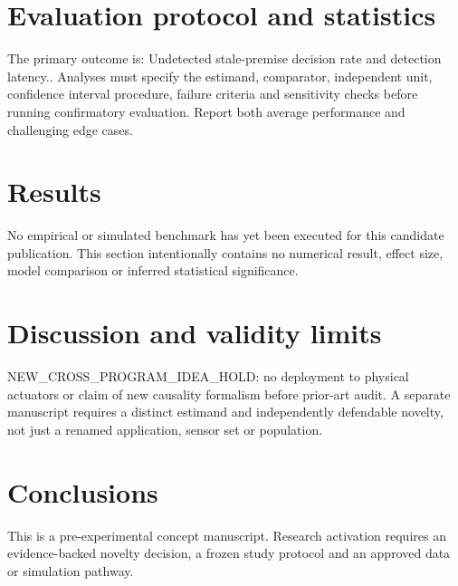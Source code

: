 \documentclass[11pt,a4paper]{article}
\begin{document}
\section{Evaluation protocol and statistics}
The primary outcome is: Undetected stale-premise decision rate and detection latency.. Analyses must specify the estimand, comparator, independent unit, confidence interval procedure, failure criteria and sensitivity checks before running confirmatory evaluation. Report both average performance and challenging edge cases.
\section{Results}
No empirical or simulated benchmark has yet been executed for this candidate publication. This section intentionally contains no numerical result, effect size, model comparison or inferred statistical significance.
\section{Discussion and validity limits}
NEW\_CROSS\_PROGRAM\_IDEA\_HOLD: no deployment to physical actuators or claim of new causality formalism before prior-art audit. A separate manuscript requires a distinct estimand and independently defendable novelty, not just a renamed application, sensor set or population.
\section{Conclusions}
This is a pre-experimental concept manuscript. Research activation requires an evidence-backed novelty decision, a frozen study protocol and an approved data or simulation pathway.
\end{document}
